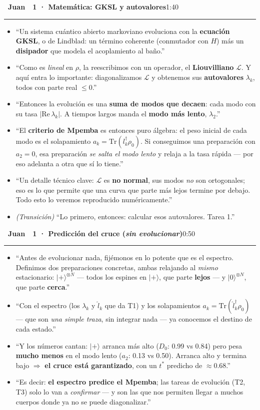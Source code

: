 \documentclass[11pt,a4paper]{article}
\newcommand{\Jb}{\colorbox{juan}{\color{white}\bfseries\footnotesize~Juan~}}
\newcommand{\cs}[1]{\textcolor{seb}{\textbf{#1}}}
\newcommand{\blk}[3]{%
  \par\medskip\noindent #1\ \textbf{#2}\hfill\textcolor{soft}{\small #3}\par
  \vspace{-4pt}\textcolor{soft!40}{\rule{\linewidth}{0.4pt}}\par\vspace{-2pt}}
\begin{document}
\blk{\Jb}{1 · Matemática: GKSL y autovalores}{1:40}
\begin{itemize}
  \item ``Un sistema cuántico abierto markoviano evoluciona con la \textbf{ecuación
    GKSL}, o de Lindblad: un término coherente (conmutador con $H$) más un
    \textbf{disipador} que modela el acoplamiento al baño.''
  \item ``Como es \emph{lineal} en $\rho$, la reescribimos con un operador, el
    \textbf{Liouvilliano} $\mathcal{L}$. Y aquí entra lo importante: diagonalizamos
    $\mathcal{L}$ y obtenemos sus \textbf{autovalores} $\lambda_k$, todos con parte
    real $\le 0$.''
  \item ``Entonces la evolución es una \textbf{suma de modos que decaen}: cada modo
    con su tasa $|\mathrm{Re}\,\lambda_k|$. A tiempos largos manda el \textbf{modo más
    lento}, $\lambda_2$.''
  \item ``El \textbf{criterio de Mpemba} es entonces puro álgebra: el peso inicial de
    cada modo es el solapamiento $a_k=\mathrm{Tr}(l_k^\dagger\rho_0)$. Si conseguimos
    una preparación con \cs{$a_2=0$}, esa preparación \emph{se salta el modo lento} y
    relaja a la tasa rápida --- por eso adelanta a otra que sí lo tiene.''
  \item ``Un detalle técnico clave: $\mathcal{L}$ es \textbf{no normal}, sus modos
    \emph{no} son ortogonales; eso es lo que permite que una curva que parte más lejos
    termine por debajo. Todo esto lo veremos reproducido numéricamente.''
  \item \emph{(Transición)} ``Lo primero, entonces: calcular esos autovalores. Tarea 1.''
\end{itemize}

\blk{\Jb}{1 · Predicción del cruce (\emph{sin evolucionar})}{0:50}
\begin{itemize}
  \item ``Antes de evolucionar nada, fijémonos en lo potente que es el espectro.
    Definimos dos preparaciones concretas, ambas relajando al \emph{mismo} estacionario:
    $|+\rangle^{\otimes N}$ --- todos los espines en $|+\rangle$, que parte \textbf{lejos}
    --- y $|0\rangle^{\otimes N}$, que parte \textbf{cerca}.''
  \item ``Con el espectro (los $\lambda_k$ y $\hat l_k$ que da T1) y los solapamientos
    $a_k=\mathrm{Tr}(\hat l_k^\dagger\rho_0)$ --- que son \emph{una simple traza}, sin
    integrar nada --- ya conocemos el destino de cada estado.''
  \item ``Y los números cantan: $|+\rangle$ arranca más alto ($D_0$: 0.99 vs 0.84) pero
    pesa \textbf{mucho menos} en el modo lento ($a_2$: 0.13 vs 0.50). Arranca alto y
    termina bajo $\Rightarrow$ \textbf{el cruce está garantizado}, con un $t^*$ predicho
    de $\approx0.68$.''
  \item ``Es decir: \cs{el espectro predice el Mpemba}; las tareas de evolución (T2, T3)
    solo lo van a \emph{confirmar} --- y son las que nos permiten llegar a muchos cuerpos
    donde ya no se puede diagonalizar.''
\end{itemize}
\end{document}
